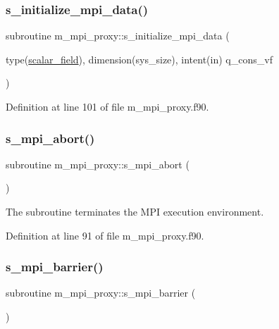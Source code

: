 \subsubsection{\texorpdfstring{s\+\_\+initialize\+\_\+mpi\+\_\+data()}{s\_initialize\_mpi\_data()}}
{\footnotesize\ttfamily subroutine m\+\_\+mpi\+\_\+proxy\+::s\+\_\+initialize\+\_\+mpi\+\_\+data (\begin{DoxyParamCaption}\item[{type(\hyperlink{structm__derived__types_1_1scalar__field}{scalar\+\_\+field}), dimension(sys\+\_\+size), intent(in)}]{q\+\_\+cons\+\_\+vf }\end{DoxyParamCaption})}



Definition at line 101 of file m\+\_\+mpi\+\_\+proxy.\+f90.

\mbox{\label{namespacem__mpi__proxy_a04ac565bad2b22dc045a5eeb4f516e2e}} 
\subsubsection{\texorpdfstring{s\+\_\+mpi\+\_\+abort()}{s\_mpi\_abort()}}
{\footnotesize\ttfamily subroutine m\+\_\+mpi\+\_\+proxy\+::s\+\_\+mpi\+\_\+abort (\begin{DoxyParamCaption}{ }\end{DoxyParamCaption})}



The subroutine terminates the M\+PI execution environment. 



Definition at line 91 of file m\+\_\+mpi\+\_\+proxy.\+f90.

\mbox{\label{namespacem__mpi__proxy_abfbc42cea69273bc9fa4a2d78f636eb1}} 
\subsubsection{\texorpdfstring{s\+\_\+mpi\+\_\+barrier()}{s\_mpi\_barrier()}}
{\footnotesize\ttfamily subroutine m\+\_\+mpi\+\_\+proxy\+::s\+\_\+mpi\+\_\+barrier (\begin{DoxyParamCaption}{ }\end{DoxyParamCaption})}



